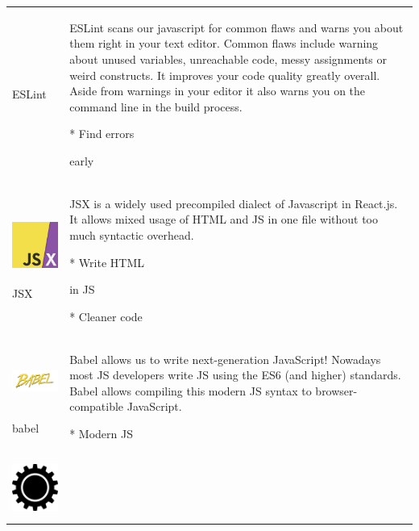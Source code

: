 \begin{longtable}[]{@{}ll@{}}
\begin{minipage}[t]{0.47\columnwidth}
ESLint\strut
\end{minipage} & \begin{minipage}[t]{0.47\columnwidth}\raggedright
ESLint scans our javascript for common flaws and warns you about them
right in your text editor. Common flaws include warning about unused
variables, unreachable code, messy assignments or weird constructs. It
improves your code quality greatly overall. Aside from warnings in your
editor it also warns you on the command line in the build process.

* Find errors

early\strut
\end{minipage}\tabularnewline
\begin{minipage}[t]{0.47\columnwidth}\raggedright
\includegraphics[width=0.66371in,height=0.66371in]{media/image34.png}

JSX\strut
\end{minipage} & \begin{minipage}[t]{0.47\columnwidth}\raggedright
JSX is a widely used precompiled dialect of Javascript in React.js. It
allows mixed usage of HTML and JS in one file without too much syntactic
overhead.

* Write HTML

in JS

* Cleaner code\strut
\end{minipage}\tabularnewline
\begin{minipage}[t]{0.47\columnwidth}\raggedright
\includegraphics[width=1.36082in,height=0.61811in]{media/image36.png}

babel\strut
\end{minipage} & \begin{minipage}[t]{0.47\columnwidth}\raggedright
Babel allows us to write next-generation JavaScript! Nowadays most JS
developers write JS using the ES6 (and higher) standards. Babel allows
compiling this modern JS syntax to browser-compatible JavaScript.

* Modern JS\strut
\end{minipage}\tabularnewline
\begin{minipage}[t]{0.47\columnwidth}\raggedright
\includegraphics[width=0.77633in,height=0.77633in]{media/image37.png}


\end{minipage}
\end{longtable}

